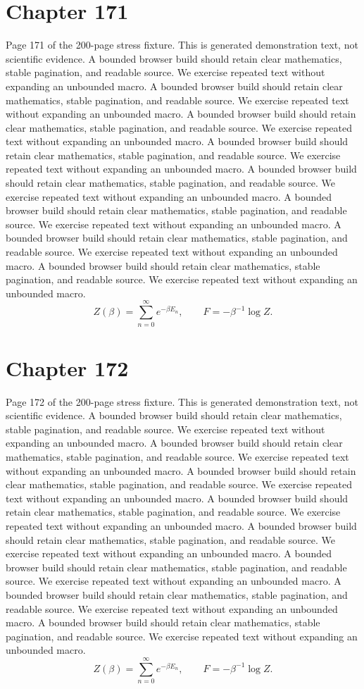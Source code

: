 \documentclass[11pt]{article}
\begin{document}
\section*{Chapter 171}
Page 171 of the 200-page stress fixture. This is generated demonstration text, not scientific evidence.
A bounded browser build should retain clear mathematics, stable pagination, and readable source. We exercise repeated text without expanding an unbounded macro.
A bounded browser build should retain clear mathematics, stable pagination, and readable source. We exercise repeated text without expanding an unbounded macro.
A bounded browser build should retain clear mathematics, stable pagination, and readable source. We exercise repeated text without expanding an unbounded macro.
A bounded browser build should retain clear mathematics, stable pagination, and readable source. We exercise repeated text without expanding an unbounded macro.
A bounded browser build should retain clear mathematics, stable pagination, and readable source. We exercise repeated text without expanding an unbounded macro.
A bounded browser build should retain clear mathematics, stable pagination, and readable source. We exercise repeated text without expanding an unbounded macro.
A bounded browser build should retain clear mathematics, stable pagination, and readable source. We exercise repeated text without expanding an unbounded macro.
A bounded browser build should retain clear mathematics, stable pagination, and readable source. We exercise repeated text without expanding an unbounded macro.
\[Z(\beta)=\sum_{n=0}^{\infty}e^{-\beta E_n},\qquad F=-\beta^{-1}\log Z.\]
\newpage
\section*{Chapter 172}
Page 172 of the 200-page stress fixture. This is generated demonstration text, not scientific evidence.
A bounded browser build should retain clear mathematics, stable pagination, and readable source. We exercise repeated text without expanding an unbounded macro.
A bounded browser build should retain clear mathematics, stable pagination, and readable source. We exercise repeated text without expanding an unbounded macro.
A bounded browser build should retain clear mathematics, stable pagination, and readable source. We exercise repeated text without expanding an unbounded macro.
A bounded browser build should retain clear mathematics, stable pagination, and readable source. We exercise repeated text without expanding an unbounded macro.
A bounded browser build should retain clear mathematics, stable pagination, and readable source. We exercise repeated text without expanding an unbounded macro.
A bounded browser build should retain clear mathematics, stable pagination, and readable source. We exercise repeated text without expanding an unbounded macro.
A bounded browser build should retain clear mathematics, stable pagination, and readable source. We exercise repeated text without expanding an unbounded macro.
A bounded browser build should retain clear mathematics, stable pagination, and readable source. We exercise repeated text without expanding an unbounded macro.
\[Z(\beta)=\sum_{n=0}^{\infty}e^{-\beta E_n},\qquad F=-\beta^{-1}\log Z.\]
\newpage
\end{document}
